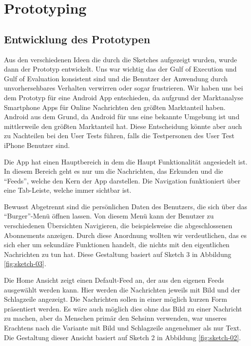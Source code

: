 
\section{Prototyping}

\subsection{Entwicklung des Prototypen}

Aus den verschiedenen Ideen die durch die Sketches aufgezeigt wurden, wurde dann der Prototyp entwickelt. Uns war wichtig das der Gulf of Execution und Gulf of Evaluation konsistent sind und die Benutzer der Anwendung durch unvorhersehbares Verhalten verwirren oder sogar frustrieren. Wir haben uns bei dem Prototyp für eine Android App entschieden, da aufgrund der Marktanalyse Smartphone Apps für Online Nachrichten den größten Marktanteil haben. Android aus dem Grund, da Android für uns eine bekannte Umgebung ist und mittlerweile den größten Marktanteil hat. Diese Entscheidung könnte aber auch zu Nachteilen bei den User Tests führen, falls die Testpersonen des User Test iPhone Benutzer sind.

Die App hat einen Hauptbereich in dem die Haupt Funktionalität angesiedelt ist. In diesem Bereich geht es nur um die Nachrichten, das Erkunden und die \enquote{Feeds}, welche den Kern der App darstellen. Die Navigation funktioniert über eine Tab-Leiste, welche immer sichtbar ist.

Bewusst Abgetrennt sind die persönlichen Daten des Benutzers, die sich über das \enquote{Burger}-Menü öffnen lassen. Von diesem Menü kann der Benutzer zu verschiedenen Übersichten Navigieren, die beispielsweise die abgeschlossenen Abonnements anzeigen. Durch diese Anordnung wollten wir verdeutlichen, das es sich eher um sekundäre Funktionen handelt, die nichts mit den eigentlichen Nachrichten zu tun hat. Diese Gestaltung basiert auf Sketch 3 in Abbildung \ref{fig:sketch-03}.

Die Home Ansicht zeigt einen Default-Feed an, der aus den eigenen Feeds ausgewählt werden kann. Hier werden die Nachrichten jeweils mit Bild und der Schlagzeile angezeigt. Die Nachrichten sollen in einer möglich kurzen Form präsentiert werden. Es wäre auch möglich dies ohne das Bild zu einer Nachricht zu machen, aber da Menschen primär den Sehsinn verwenden, war unseres Erachtens nach die Variante mit Bild und Schlagzeile angenehmer als nur Text. Die Gestaltung dieser Ansicht basiert auf Sketch 2 in Abbildung \ref{fig:sketch-02}.

